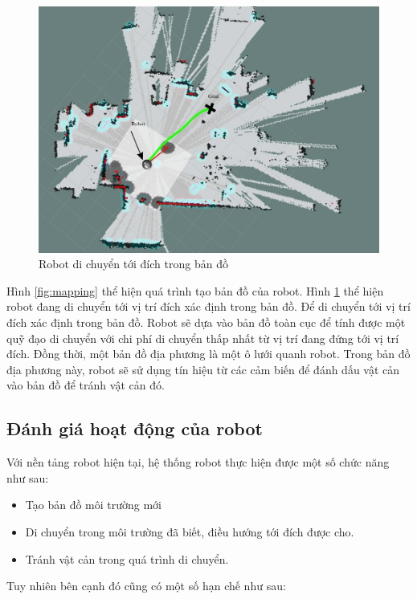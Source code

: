\begin{figure}[htbp]
    \centering
    \includegraphics[width=0.75\linewidth]{figures/RB_navi_in_map.jpg}
    \caption{Robot di chuyển tới đích trong bản đồ}
    \label{fig:navigation}
\end{figure}

Hình \ref{fig:mapping} thể hiện quá trình tạo bản đồ của robot.
Hình \ref{fig:navigation} thể hiện robot đang di chuyển tới vị trí đích xác định trong bản đồ.
Để di chuyển tới vị trí đích xác định trong bản đồ. Robot sẽ dựa vào bản đồ toàn cục để tính được một quỹ đạo di chuyển với chi phí di chuyển thấp nhất từ vị trí đang đứng tới vị trí đích.
Đồng thời, một bản đồ địa phương là một ô lưới quanh robot. Trong bản đồ địa phương này, robot sẽ sử dụng tín hiệu từ các cảm biến để đánh dấu vật cản vào bản đồ để tránh vật cản đó.

\subsection{Đánh giá hoạt động của robot}

Với nền tảng robot hiện tại, hệ thống robot thực hiện được một số chức năng như sau:

\begin{itemize}
    \item Tạo bản đồ môi trường mới
    \item Di chuyển trong môi trường đã biết, điều hướng tới đích được cho.
    \item Tránh vật cản trong quá trình di chuyển.
\end{itemize}

Tuy nhiên bên cạnh đó cũng có một số hạn chế như sau:

